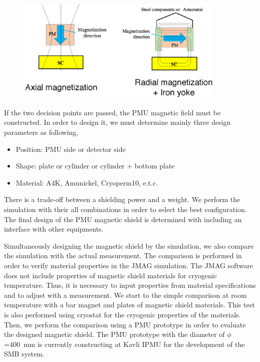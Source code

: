 \documentclass[11pt]{article}
\begin{document}
\begin{figure}[htbp]
  \centering
  \includegraphics[width=100mm]{figs/MagneticCircuit.eps}
  \caption{}
  \label{fig:MC}
\end{figure}

If the two decision points are passed, the PMU magnetic field must be constructed.
In order to design it, we must determine mainly three design parameters as following,
\begin{itemize}
 \item Position: PMU side or detector side
 \item Shape: plate or cylinder or cylinder + bottom plate
 \item Material: A4K, Amunickel, Cryoperm10, e.t.c.
\end{itemize}
There is a trade-off between a shielding power and a weight.
We perform the simulation with their all combinations in order to select the best configuration.
The final design of the PMU magnetic shield is determined with including an interface with other equipments.

Simultaneously designing the magnetic shield by the simulation, we also compare the simulation with the actual measurement.
The comparison is performed in order to verify material properties in the JMAG simulation.
The JMAG software does not include properties of magnetic shield materials for cryogenic temperature.
Thus, it is necessary to input properties from material specifications and to adjust with a measurement.
We start to the simple comparison at room temperature with a bar magnet and plates of magnetic shield materials.
This test is also performed using cryostat for the cryogenic properties of the materials.
Then, we perform the comparison using a PMU prototype in order to evaluate the designed magnetic shield.
The PMU prototype with the diameter of $\phi$=400~mm is currently constructing at Kavli IPMU for the development of the SMB system.
\end{document}
